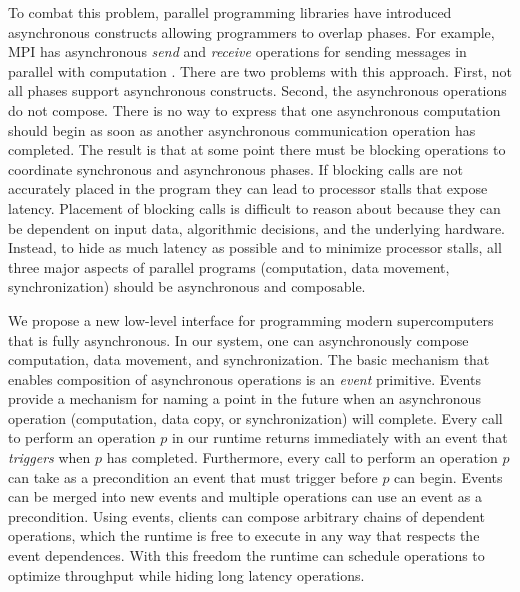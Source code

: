 To combat this problem, parallel programming libraries have introduced
asynchronous constructs allowing programmers to overlap phases.  For
example, MPI has asynchronous {\em send} and {\em receive} operations
for sending messages in parallel with computation \cite{MPI}.  There
are two problems with this approach.  First, not all phases support
asynchronous constructs.  Second, the asynchronous operations do not
compose.  There is no way to express that one asynchronous computation
should begin as soon as another asynchronous communication operation
has completed.  The result is that at some point there must be
blocking operations to coordinate synchronous and asynchronous phases.
If blocking calls are not accurately placed in the program they can
lead to processor stalls that expose latency.  Placement of blocking
calls is difficult to reason about because 
they can be dependent on input data, algorithmic decisions, 
and the underlying hardware.  Instead, to hide as much
latency as possible and to minimize processor stalls, 
all three major aspects of parallel programs (computation, data movement,
synchronization) should be asynchronous and composable.

We propose a new low-level interface for programming modern
supercomputers that is fully asynchronous. In our system, one can
asynchronously compose computation, data movement, and
synchronization.  The basic mechanism that enables composition of 
asynchronous operations
is an {\em event} primitive.  Events provide a mechanism
for naming a point in the future when an asynchronous operation
(computation, data copy, or synchronization) will complete.  Every
call to perform an operation $p$ in our runtime returns immediately
with an event that {\em triggers} when $p$ has completed.
Furthermore, every call to perform an operation $p$ can take as a
precondition an event that must trigger before $p$ can begin.
Events can be merged into new events and multiple operations
can use an event as a precondition.
Using events, clients can compose arbitrary chains of dependent
operations, which the runtime is free to execute in any way that
respects the event dependences.  With this freedom the runtime can
schedule operations to optimize throughput while hiding long
latency operations.

